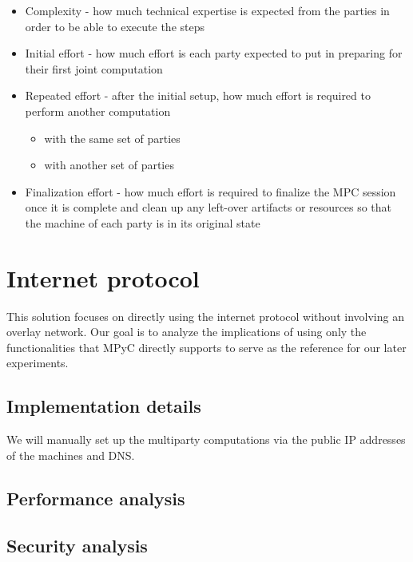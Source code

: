 \begin{itemize}
\tightlist
\item
  Complexity - how much technical expertise is expected from the parties
  in order to be able to execute the steps
\item
  Initial effort - how much effort is each party expected to put in
  preparing for their first joint computation
\item
  Repeated effort - after the initial setup, how much effort is required
  to perform another computation

  \begin{itemize}
  \tightlist
  \item
    with the same set of parties
  \item
    with another set of parties
  \end{itemize}
\item
  Finalization effort - how much effort is required to finalize the MPC
  session once it is complete and clean up any left-over artifacts or
  resources so that the machine of each party is in its original state
\end{itemize}

\hypertarget{internet-protocol}{%
\chapter{Internet protocol}\label{internet-protocol}}

This solution focuses on directly using the internet protocol without
involving an overlay network. Our goal is to analyze the implications of
using only the functionalities that MPyC directly supports to serve as
the reference for our later experiments.

\hypertarget{implementation-details}{%
\section{Implementation details}\label{implementation-details}}

We will manually set up the multiparty computations via the public IP
addresses of the machines and DNS.

\hypertarget{performance-analysis}{%
\section{Performance analysis}\label{performance-analysis}}

\hypertarget{security-analysis}{%
\section{Security analysis}\label{security-analysis}}

